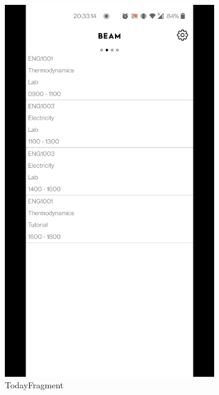 \documentclass[../report.tex]{subfiles}
\begin{document}
\begin{figure} [H]
\begin{subfigure}[b]{0.28\textwidth}
		\includegraphics[width=\textwidth]{../images/07/02-app-today.jpg}
		\caption{TodayFragment}
		\label{fig:app-today-frag}
	\end{subfigure}
	\par
	\begin{subfigure}[b]{0.28\textwidth}
		\centering

\end{subfigure}
\end{figure}
\end{document}
